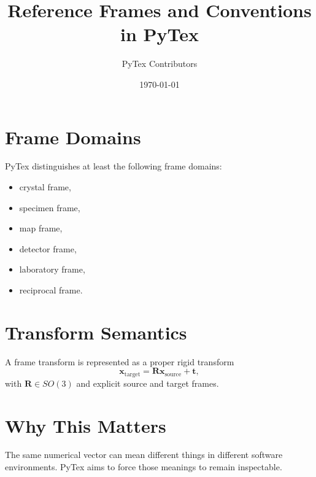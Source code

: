\documentclass[11pt]{article}
\title{Reference Frames and Conventions in PyTex}
\author{PyTex Contributors}
\date{\today}
\begin{document}
\maketitle

\section{Frame Domains}

PyTex distinguishes at least the following frame domains:

\begin{itemize}
  \item crystal frame,
  \item specimen frame,
  \item map frame,
  \item detector frame,
  \item laboratory frame,
  \item reciprocal frame.
\end{itemize}

\section{Transform Semantics}

A frame transform is represented as a proper rigid transform
\[
  \mathbf{x}_{\text{target}} = \mathbf{R}\mathbf{x}_{\text{source}} + \mathbf{t},
\]
with $\mathbf{R} \in SO(3)$ and explicit source and target frames.

\section{Why This Matters}

The same numerical vector can mean different things in different software environments. PyTex aims to force those meanings to remain inspectable.
\end{document}
